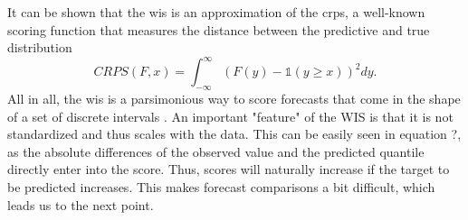 It can be shown that the \ac{wis} is an approximation of the \ac{crps}, a well-known scoring function that measures the distance between the predictive and true distribution 
\begin{equation}
CRPS(F, x) = \int_{-\infty}^{\infty} \left(F(y) - \mathbb{1}(y \geq x) \right)^2dy.
\end{equation}
All in all, the \ac{wis} is a parsimonious way to score forecasts that come in the shape of a set of discrete intervals \citep{sherratt_predictive_2022}.
An important "feature" of the WIS is that it is not standardized and thus scales with the data. This can be easily seen in equation ?, as the absolute differences of the observed value and the predicted quantile directly enter into the score. Thus, scores will naturally increase if the target to be predicted increases. This makes forecast comparisons a bit difficult, which leads us to the next point.
